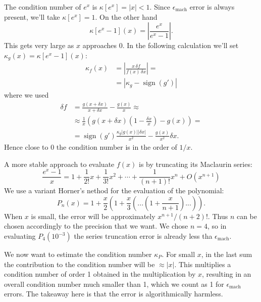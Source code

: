 \documentclass[a4paper,11]{article}
\DeclareMathOperator{\sign}{sign}
\newcommand{\emach}{\epsilon_{\text{mach}}}
\begin{document}
The condition number of $e^{x}$ is $\kappa[e^{x}]=|x|<1$. 
Since $\epsilon_{\text{mach}}$
error is always present, we'll take $\kappa[e^{x}]=1$.
On the other hand
\[
	\kappa[e^{x}-1](x) = \left|\frac{e^{x}}{e^{x}-1}\right|.
\]
This gets very large as $x$ approaches 0. In the following calculation 
we'll set $\kappa_{g}(x)=\kappa[e^{x}-1](x)$:
\[
\begin{split}
	\kappa_{f}(x) &= \left| \frac{x\,\delta f }{f(x)\,\delta x}\right| =\\
	&= |\kappa_{g}-\sign(g')|
\end{split}
\]
where we used
\[{}
\begin{split}
	\delta f &= \frac{g(x+\delta x)}{x+\delta x}-\frac{g(x)}{x} \approx \\
	&\approx \frac{1}{x}\left( g(x+\delta x)\left(1-
		\frac{\delta x}{x}\right) - g(x)\right) = \\
	&= \sign(g')\frac{\kappa_{g}|g(x)||\delta x|}{x^{2}} 
		- \frac{g(x)}{x^{2}}\delta x.
\end{split}
\]
Hence close to 0 the condition number is in the order of $1/x$.

A more stable approach to evaluate $f(x)$ is by truncating its Maclaurin series:
\[
	\frac{e^{x}-1}{x}=1+\frac{1}{2!}x + \frac{1}{3!}x^2 + \cdots 
		+ \frac{1}{(n+1)!}x^n + O(x^{n+1})
\]
We use a variant Horner's nethod for the evaluation of the polynomial:
\[
	P_{n}(x)=1+\frac{x}{2}\left(1+\frac{x}{3}\left(...\left(1+\frac{x}{n+1}
		\right)...\right)\right).
\]
When $x$ is small, the error will be approximately $x^{n+1}/(n+2)!$.
Thus $n$ can be chosen accordingly to the precision that we want. 
We chose $n=4$, so in evaluating $P_{4}(10^{-3})$ the series
truncation error is already less tha $\emach$.

We now want to estimate the condition number $\kappa_{P}$.
For small $x$, in the last sum the contribution to the condition number 
will be $\approx |x|$. This multiplies a condition number of order 1 obtained
in the multiplication by $x$, resulting in an overall condition number much 
smaller than 1, which we count as 1 for $\epsilon_{\text{mach}}$
errors. The takeaway here is that the error is algorithmically harmless.
\end{document}
